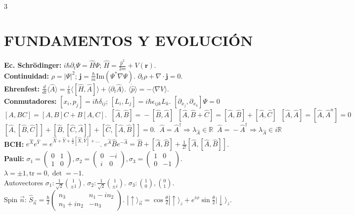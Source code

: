\documentclass[8pt,a4paper,fleqn]{extarticle} %
\begin{document}
\begin{multicols}{3}
\raggedright
\scriptsize

\section{FUNDAMENTOS Y EVOLUCIÓN}
\textbf{Ec. Schrödinger:} $i\hbar \partial_t \Psi = \hat{H}\Psi$; $\hat{H} = \frac{\hat{p}^2}{2m} + V(\mathbf{r})$.\\
\textbf{Continuidad:} $\rho = |\Psi|^2$; $\mathbf{j} = \frac{\hbar}{m} \text{Im}(\Psi^* \nabla \Psi)$. $\partial_t \rho + \nabla \cdot \mathbf{j} = 0$.\\
\textbf{Ehrenfest:} $\frac{d}{dt}\langle \hat{A} \rangle = \frac{i}{\hbar} \langle [\hat{H}, \hat{A}] \rangle + \langle \partial_t \hat{A} \rangle$. $\langle \dot{\hat{p}} \rangle = -\langle \nabla V \rangle$.\\
\textbf{Conmutadores:} $[x_i, p_j] = i\hbar \delta_{ij}$; $[L_i, L_j] = i\hbar \epsilon_{ijk} L_k$. $[\partial_{x_j}, \partial_{x_k}]\Psi = 0$\\
$ [A, BC] = [A, B]C + B[A, C]. \;\; 
[\hat{A},\hat{B}]\!=\!-[\hat{B},\hat{A}]\;\;[\hat{A},\hat{B}\!+\!\hat{C}]\!=\![\hat{A},\hat{B}]\!+\![\hat{A},\hat{C}]\;\;[\hat{A},\hat{A}]\!=\!
[\hat{A},\hat{A}^n]\!=\!0 $\\
$[\hat{A},[\hat{B},\hat{C}]]\!+\![\hat{B},[\hat{C},\hat{A}]]\!+\![\hat{C},[\hat{A},\hat{B}]]\!=\!0. \;\;\hat{A}\!=\!\hat{A}^\dagger\!\Rightarrow\!\lambda_{\hat{A}} \!\in\!\mathbb{R}\;\;\hat{A}\!=\!-\hat{A}^\dagger\!\Rightarrow\!\lambda_{\hat{A}}\!\in\!i\mathbb{R}$\\
\textbf{BCH:} $e^{\hat{X}}e^{\hat{Y}} = e^{\hat{X}+\hat{Y} + \frac{1}{2}[\hat{X},\hat{Y}] + \dots}$. $e^{\hat{A}}\hat{B}e^{-\hat{A}} = \hat{B} + [\hat{A},\hat{B}] + \frac{1}{2!}[\hat{A},[\hat{A},\hat{B}]]$.\\
\textbf{Pauli:} $\sigma_1 = \begin{pmatrix} 0 & 1 \\ 1 & 0 \end{pmatrix}, \sigma_2 = \begin{pmatrix} 0 & -i \\ i & 0 \end{pmatrix}, \sigma_3 = \begin{pmatrix} 1 & 0 \\ 0 & -1 \end{pmatrix}$. $\lambda = \pm 1, \text{tr}=0, \det=-1$.\\
Autovectores $\sigma_1: \frac{1}{\sqrt{2}}\binom{1}{\pm 1}$. $\sigma_2: \frac{1}{\sqrt{2}}\binom{1}{\pm i}$. $\sigma_3: \binom{1}{0}, \binom{0}{1}$.\\
Spin $\vec{n}$: $\hat{S}_{\vec{n}} = \frac{\hbar}{2}\begin{pmatrix} n_3 & n_1-in_2 \\ n_1+in_2 & -n_3 \end{pmatrix}$. $|\uparrow\rangle_{\vec{n}} = \cos\frac{\theta}{2}|\uparrow\rangle_z + e^{i\phi}\sin\frac{\theta}{2}|\downarrow\rangle_z$.


\end{multicols}
\end{document}
